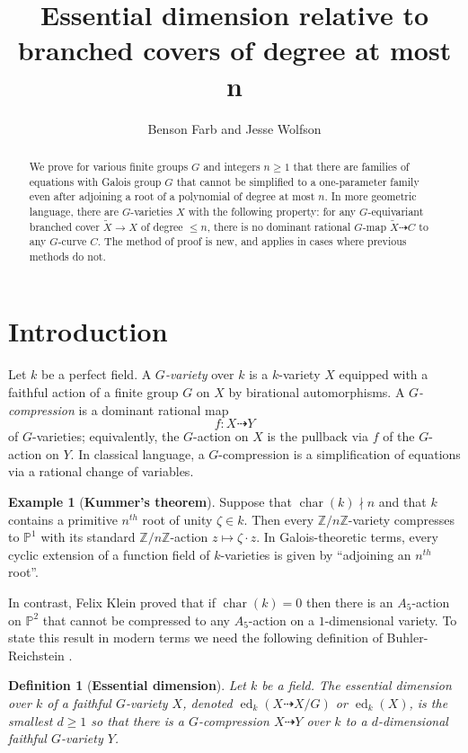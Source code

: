 \documentclass[11pt]{amsart}
\title{Essential dimension relative to branched covers of degree at most n}
\author{Benson Farb and Jesse Wolfson}
\newtheorem{definition}[theorem]{Definition}
\theoremstyle{definition}
\newtheorem{example}[theorem]{Example}
\numberwithin{equation}{section}
\newcommand{\Pb}{\mathbb{P}}
\newcommand{\Zb}{\mathbb{Z}}
\DeclareMathOperator{\ed}{ed}
\DeclareMathOperator{\characteristic}{char}
\begin{document}
\maketitle
\begin{abstract}
We prove for various finite groups $G$ and integers $n\geq 1$ that there are families of equations with Galois group $G$ that cannot be simplified to a one-parameter family even after adjoining a root of a polynomial of degree at most $n$.  In more geometric language, there are $G$-varieties $X$ with the following property: for any $G$-equivariant branched cover $\widetilde{X}\to X$ of degree $\leq n$, there is no dominant rational $G$-map $\widetilde{X}\dashrightarrow C$ to any $G$-curve $C$.  The method  of proof is new, and applies in cases where previous methods do not.
\end{abstract}


\section{Introduction}
Let $k$ be a perfect field. A {\em $G$-variety} over $k$ is a $k$-variety $X$ equipped with a faithful action of a finite group $G$ on $X$ by birational automorphisms. 
A {\em $G$-compression} is a dominant rational map 
\[f:X\dashrightarrow Y\] of $G$-varieties; equivalently, the $G$-action on $X$ is the pullback via $f$ of the $G$-action on $Y$.  In classical language, a $G$-compression is a simplification of equations via a rational change of variables.  

\begin{example}[{\bf Kummer's theorem}]
Suppose that $\characteristic(k)\nmid n$ and that $k$ contains a primitive $n^{th}$ root of unity $\zeta\in k$. Then every $\Zb/n\Zb$-variety compresses to $\Pb^1$ with its standard $\Zb/n\Zb$-action $z\mapsto \zeta\cdot z$. In Galois-theoretic terms, every cyclic extension of a function field of $k$-varieties is given by ``adjoining an $n^{th}$ root''.
\end{example}

In contrast, Felix Klein proved that if $\characteristic(k)=0$ then there is an $A_5$-action on $\Pb^2$ that cannot be compressed to any $A_5$-action on a $1$-dimensional variety.  To state this result in modern terms we need the following definition of Buhler-Reichstein \cite{BR}.

\begin{definition}[{\bf Essential dimension}]
Let $k$ be a field. The {\em essential dimension} over $k$  of a  faithful $G$-variety $X$, denoted 
$\ed_k(X\dashrightarrow X/G)$ or $\ed_k(X)$, is the smallest $d\geq 1$ so that there is a $G$-compression $X\dashrightarrow Y$ over $k$ to a $d$-dimensional faithful $G$-variety $Y$.  
\end{definition}
\end{document}
